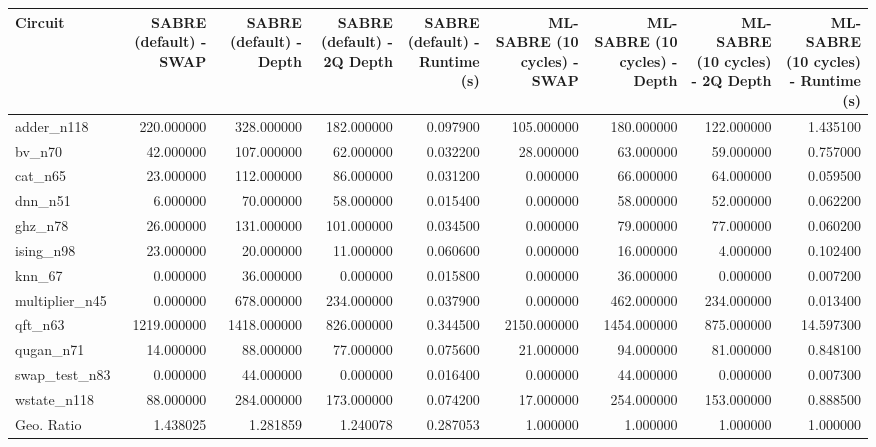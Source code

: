 \begin{tabular}{lrrrrrrrr}
\toprule
Circuit & SABRE (default) - SWAP & SABRE (default) - Depth & SABRE (default) - 2Q Depth & SABRE (default) - Runtime (s) & ML-SABRE (10 cycles) - SWAP & ML-SABRE (10 cycles) - Depth & ML-SABRE (10 cycles) - 2Q Depth & ML-SABRE (10 cycles) - Runtime (s) \\
\midrule
adder\_n118 & 220.000000 & 328.000000 & 182.000000 & 0.097900 & 105.000000 & 180.000000 & 122.000000 & 1.435100 \\
bv\_n70 & 42.000000 & 107.000000 & 62.000000 & 0.032200 & 28.000000 & 63.000000 & 59.000000 & 0.757000 \\
cat\_n65 & 23.000000 & 112.000000 & 86.000000 & 0.031200 & 0.000000 & 66.000000 & 64.000000 & 0.059500 \\
dnn\_n51 & 6.000000 & 70.000000 & 58.000000 & 0.015400 & 0.000000 & 58.000000 & 52.000000 & 0.062200 \\
ghz\_n78 & 26.000000 & 131.000000 & 101.000000 & 0.034500 & 0.000000 & 79.000000 & 77.000000 & 0.060200 \\
ising\_n98 & 23.000000 & 20.000000 & 11.000000 & 0.060600 & 0.000000 & 16.000000 & 4.000000 & 0.102400 \\
knn\_67 & 0.000000 & 36.000000 & 0.000000 & 0.015800 & 0.000000 & 36.000000 & 0.000000 & 0.007200 \\
multiplier\_n45 & 0.000000 & 678.000000 & 234.000000 & 0.037900 & 0.000000 & 462.000000 & 234.000000 & 0.013400 \\
qft\_n63 & 1219.000000 & 1418.000000 & 826.000000 & 0.344500 & 2150.000000 & 1454.000000 & 875.000000 & 14.597300 \\
qugan\_n71 & 14.000000 & 88.000000 & 77.000000 & 0.075600 & 21.000000 & 94.000000 & 81.000000 & 0.848100 \\
swap\_test\_n83 & 0.000000 & 44.000000 & 0.000000 & 0.016400 & 0.000000 & 44.000000 & 0.000000 & 0.007300 \\
wstate\_n118 & 88.000000 & 284.000000 & 173.000000 & 0.074200 & 17.000000 & 254.000000 & 153.000000 & 0.888500 \\
Geo. Ratio & 1.438025 & 1.281859 & 1.240078 & 0.287053 & 1.000000 & 1.000000 & 1.000000 & 1.000000 \\
\bottomrule
\end{tabular}
